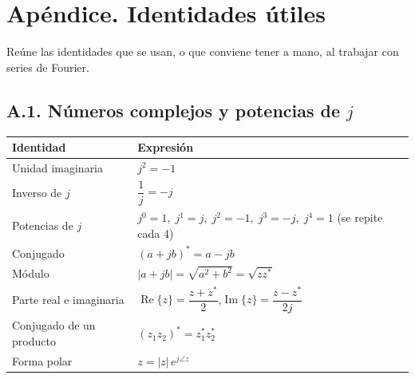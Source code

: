 \documentclass[11pt,a4paper]{article}
\DeclareMathOperator{\Real}{Re}
\DeclareMathOperator{\Imag}{Im}
\begin{document}
\section*{Apéndice. Identidades útiles}
Reúne las identidades que se usan, o que conviene tener a mano, al trabajar con series de
Fourier.

\subsection*{A.1. Números complejos y potencias de \texorpdfstring{$j$}{j}}
\begin{table}[H]
\centering
\renewcommand{\arraystretch}{1.5}
\begin{tabularx}{\textwidth}{>{\raggedright\arraybackslash}p{4.4cm}X}
\toprule
\textbf{Identidad} & \textbf{Expresión}\\
\midrule
Unidad imaginaria & $j^{2}=-1$\\
Inverso de $j$ & $\dfrac{1}{j}=-j$\\
Potencias de $j$ & $j^{0}=1,\;j^{1}=j,\;j^{2}=-1,\;j^{3}=-j,\;j^{4}=1$ (se repite cada 4)\\
Conjugado & $(a+jb)^{*}=a-jb$\\
Módulo & $|a+jb|=\sqrt{a^{2}+b^{2}}=\sqrt{zz^{*}}$\\
Parte real e imaginaria & $\Real\{z\}=\dfrac{z+z^{*}}{2}$,\quad $\Imag\{z\}=\dfrac{z-z^{*}}{2j}$\\
Conjugado de un producto & $(z_1z_2)^{*}=z_1^{*}z_2^{*}$\\
Forma polar & $z=|z|\,e^{j\angle z}$\\
\bottomrule
\end{tabularx}
\end{table}
\end{document}
